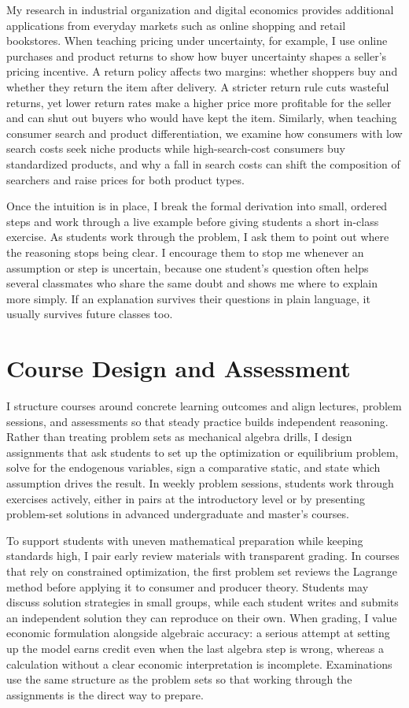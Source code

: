 \documentclass[11pt]{article}
\begin{document}
My research in industrial organization and digital economics provides additional applications from everyday markets such as online shopping and retail bookstores. When teaching pricing under uncertainty, for example, I use online purchases and product returns to show how buyer uncertainty shapes a seller's pricing incentive. A return policy affects two margins: whether shoppers buy and whether they return the item after delivery. A stricter return rule cuts wasteful returns, yet lower return rates make a higher price more profitable for the seller and can shut out buyers who would have kept the item. Similarly, when teaching consumer search and product differentiation, we examine how consumers with low search costs seek niche products while high-search-cost consumers buy standardized products, and why a fall in search costs can shift the composition of searchers and raise prices for both product types.

Once the intuition is in place, I break the formal derivation into small, ordered steps and work through a live example before giving students a short in-class exercise. As students work through the problem, I ask them to point out where the reasoning stops being clear. I encourage them to stop me whenever an assumption or step is uncertain, because one student's question often helps several classmates who share the same doubt and shows me where to explain more simply. If an explanation survives their questions in plain language, it usually survives future classes too.

\section*{Course Design and Assessment}

I structure courses around concrete learning outcomes and align lectures, problem sessions, and assessments so that steady practice builds independent reasoning. Rather than treating problem sets as mechanical algebra drills, I design assignments that ask students to set up the optimization or equilibrium problem, solve for the endogenous variables, sign a comparative static, and state which assumption drives the result. In weekly problem sessions, students work through exercises actively, either in pairs at the introductory level or by presenting problem-set solutions in advanced undergraduate and master's courses.

To support students with uneven mathematical preparation while keeping standards high, I pair early review materials with transparent grading. In courses that rely on constrained optimization, the first problem set reviews the Lagrange method before applying it to consumer and producer theory. Students may discuss solution strategies in small groups, while each student writes and submits an independent solution they can reproduce on their own. When grading, I value economic formulation alongside algebraic accuracy: a serious attempt at setting up the model earns credit even when the last algebra step is wrong, whereas a calculation without a clear economic interpretation is incomplete. Examinations use the same structure as the problem sets so that working through the assignments is the direct way to prepare.
\end{document}
